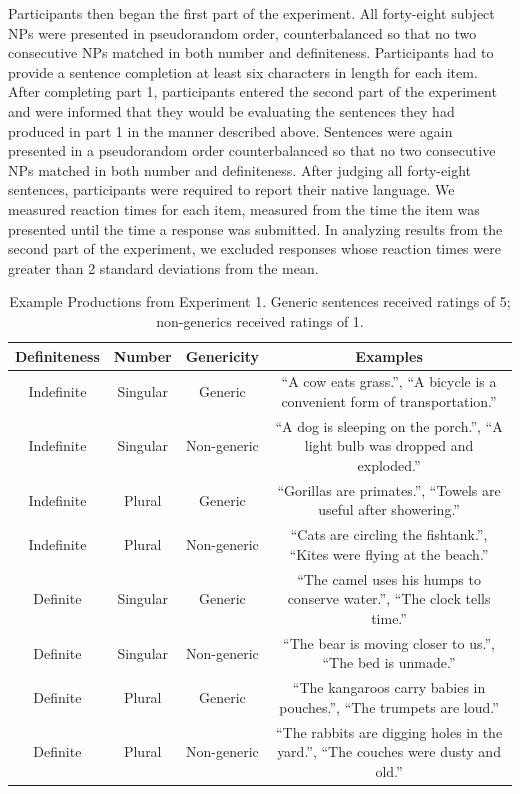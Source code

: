 \documentclass[10pt,letterpaper]{article}
\begin{document}
Participants then began the first part of the experiment. All forty-eight subject NPs were presented in pseudorandom order, counterbalanced so that no two consecutive NPs matched in both number and definiteness. Participants had to provide a sentence completion at least six characters in length for each item. After completing part 1, participants entered the second part of the experiment and were informed that they would be evaluating the sentences they had produced in part 1 in the manner described above. Sentences were again presented in a pseudorandom order counterbalanced so that no two consecutive NPs matched in both number and definiteness. After judging all forty-eight sentences, participants were required to report their native language. We measured reaction times for each item, measured from the time the item was presented until the time a response was submitted. In analyzing results from the second part of the experiment, we excluded responses whose reaction times were greater than 2 standard deviations from the mean.



\begin{table}
\begin{center} 
\caption{Example Productions from Experiment 1. Generic sentences received ratings of 5; non-generics received ratings of 1.} 
\label{tab:ex} 
\vskip 0.12in
\begin{tabular}{cccc} 
\hline
Definiteness    &  Number & Genericity & Examples \\
\hline
Indefinite        &   Singular & Generic & ``A cow eats grass.'', ``A bicycle is a convenient form of transportation.''\\
Indefinite  &   Singular & Non-generic & ``A dog is sleeping on the porch.'', ``A light bulb was dropped and exploded.''\\
Indefinite           &   Plural & Generic & ``Gorillas are primates.'', ``Towels are useful after showering.''\\
Indefinite         &   Plural  & Non-generic & ``Cats are circling the fishtank.'', ``Kites were flying at the beach.''\\
Definite        &   Singular & Generic & ``The camel uses his humps to conserve water.'', ``The clock tells time.''  \\
Definite  &   Singular & Non-generic & ``The bear is moving closer to us.'', ``The bed is unmade.''\\
Definite           &   Plural & Generic & ``The kangaroos carry babies in pouches.'', ``The trumpets are loud.'' \\
Definite         &   Plural & Non-generic & ``The rabbits are digging holes in the yard.'', ``The couches were dusty and old.''\\
\hline
\end{tabular} 
\end{center} 
\end{table}
\end{document}
